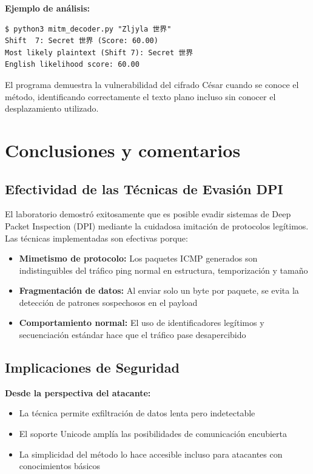 \documentclass[letter,12pt]{article}
\begin{document}
\textbf{Ejemplo de análisis:}
\begin{verbatim}
$ python3 mitm_decoder.py "Zljyla 世界"
Shift  7: Secret 世界 (Score: 60.00)
Most likely plaintext (Shift 7): Secret 世界
English likelihood score: 60.00
\end{verbatim}

El programa demuestra la vulnerabilidad del cifrado César cuando se conoce el método, identificando correctamente el texto plano incluso sin conocer el desplazamiento utilizado.



\section*{Conclusiones y comentarios}

\subsection*{Efectividad de las Técnicas de Evasión DPI}

El laboratorio demostró exitosamente que es posible evadir sistemas de Deep Packet Inspection (DPI) mediante la cuidadosa imitación de protocolos legítimos. Las técnicas implementadas son efectivas porque:

\begin{itemize}
    \item \textbf{Mimetismo de protocolo:} Los paquetes ICMP generados son indistinguibles del tráfico ping normal en estructura, temporización y tamaño
    
    \item \textbf{Fragmentación de datos:} Al enviar solo un byte por paquete, se evita la detección de patrones sospechosos en el payload
    
    \item \textbf{Comportamiento normal:} El uso de identificadores legítimos y secuenciación estándar hace que el tráfico pase desapercibido
\end{itemize}

\subsection*{Implicaciones de Seguridad}

\textbf{Desde la perspectiva del atacante:}
\begin{itemize}
    \item La técnica permite exfiltración de datos lenta pero indetectable
    
    \item El soporte Unicode amplía las posibilidades de comunicación encubierta
    
    \item La simplicidad del método lo hace accesible incluso para atacantes con conocimientos básicos
\end{itemize}
\end{document}
